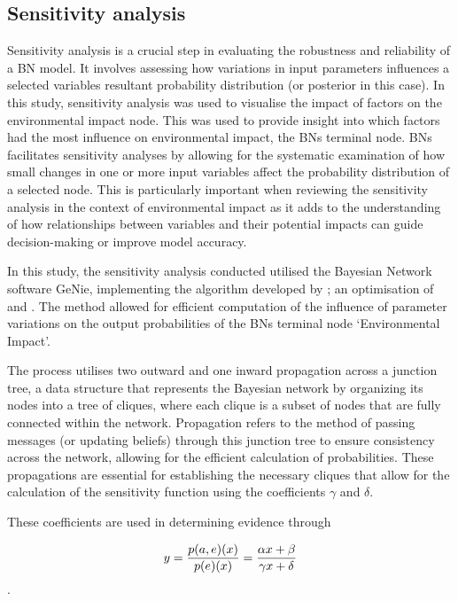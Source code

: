 \documentclass[fleqn,10pt]{wlscirep}
\begin{document}
\subsection{Sensitivity analysis}

Sensitivity analysis is a crucial step in evaluating the robustness and reliability of a BN model. It involves assessing how variations in input parameters influences a selected variables resultant probability distribution (or posterior in this case). In this study, sensitivity analysis was used to visualise the impact of factors on the environmental impact node. This was used to provide insight into which factors had the most influence on environmental impact, the BNs terminal node. BNs facilitates sensitivity analyses by allowing for the systematic examination of how small changes in one or more input variables affect the probability distribution of a selected node. This is particularly important when reviewing the sensitivity analysis in the context of environmental impact as it adds to the understanding of how relationships between variables and their potential impacts can guide decision-making or improve model accuracy.

In this study, the sensitivity analysis conducted utilised the Bayesian Network software GeNie, implementing the algorithm developed by ; an optimisation of  and . The method allowed for efficient computation of the influence of parameter variations on the output probabilities of the BNs terminal node `Environmental Impact'.

The process utilises two outward and one inward propagation across a junction tree, a data structure that represents the Bayesian network by organizing its nodes into a tree of cliques, where each clique is a subset of nodes that are fully connected within the network. Propagation refers to the method of passing messages (or updating beliefs) through this junction tree to ensure consistency across the network, allowing for the efficient calculation of probabilities. These propagations are essential for establishing the necessary cliques that allow for the calculation of the sensitivity function using the coefficients $\gamma$ and $\delta$.

These coefficients are used in determining evidence through

\begin{equation}
y = {{p(a, e)(x)}\over{p(e)(x)}}={{\alpha x + \beta}\over{\gamma x + \delta}}
\end{equation}.
\end{document}
